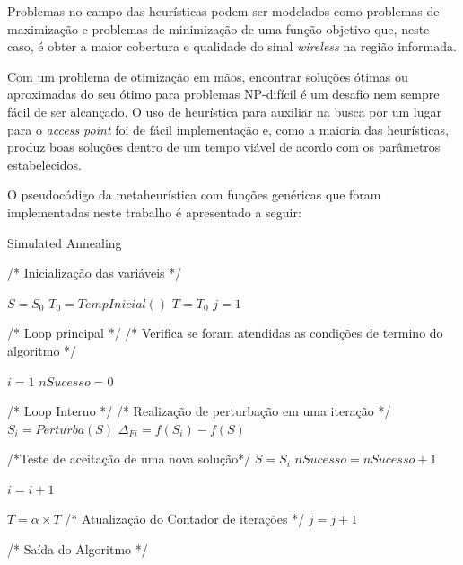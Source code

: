 \documentclass[
	12pt,				%
	twoside,			%
	a4paper,			%
	english,			%
	french,				%
	spanish,			%
	brazil				%
	]{abntex2}
\begin{document}
Problemas no campo das heurísticas podem ser modelados como problemas de
maximização e problemas de minimização de uma função objetivo que, neste
caso, é obter a maior cobertura e qualidade do sinal \emph{wireless} na
região informada.

Com um problema de otimização em mãos, encontrar soluções ótimas ou
aproximadas do seu ótimo para problemas NP-difícil é um desafio nem
sempre fácil de ser alcançado. O uso de heurística para auxiliar na
busca por um lugar para o \emph{access point} foi de fácil implementação
e, como a maioria das heurísticas, produz boas soluções dentro de um
tempo viável de acordo com os parâmetros estabelecidos.

O pseudocódigo da metaheurística com funções genéricas que foram
implementadas neste trabalho é apresentado a seguir:

\clearpage

\begin{algorithm}
    \caption{Simulated Annealing}\label{sa}
    \begin{algorithmic}[1]
        
        \State/* Inicialização das variáveis */
        
        \State $S = S_{0}$
        \State $T_{0} = TempInicial()$
        \State $T = T_{0}$
        \State $j = 1$
        
        \State /* Loop principal */
        \State /* Verifica se foram atendidas as condições de termino do algoritmo */
        \Repeat
        
        \State $i = 1$
        \State $nSucesso = 0$
        
        \State /* Loop Interno */
        \State /* Realização de perturbação em uma iteração */
            \Repeat
                \State $S_{i} = Perturba(S)$
                \State $\Delta_{Fi} = f(S_{i}) - f(S)$
                
                \State /*Teste de aceitação de uma nova solução*/
                    \State $S = S_{i}$
                    \State $nSucesso = nSucesso + 1$
                \EndIf
            
            \State $i = i + 1$
        
           \State $T = \alpha \times T$
           \State /* Atualização do Contador de iterações */
           \State $j = j + 1$
        
        
        \State /* Saída do Algoritmo */
        \State {}
        
        \EndProcedure
    \end{algorithmic}
\end{algorithm}
\end{document}
